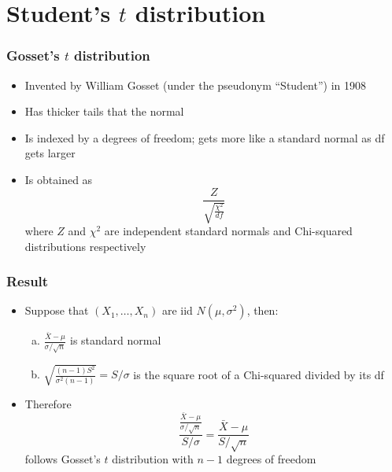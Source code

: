 \documentclass[aspectratio=169]{beamer}
\begin{document}
\section{Student's $t$ distribution}
\begin{frame}\frametitle{Gosset's $t$ distribution}
\begin{itemize}
\item Invented by William Gosset (under the pseudonym ``Student'') in 1908
\item Has thicker tails that the normal
\item Is indexed by a degrees of freedom; gets more like a standard
  normal as df gets larger
\item Is obtained as 
$$
\frac{Z}{\sqrt{\frac{\chi^2}{df}}}
$$
where $Z$ and $\chi^2$ are independent standard normals and
Chi-squared distributions respectively
\end{itemize}
\end{frame}

\begin{frame}\frametitle{Result}
\begin{itemize}
\item Suppose that $(X_1,\ldots,X_n)$ are iid $N(\mu,\sigma^2)$,
  then:
  \begin{enumerate}[a.]
  \item $\frac{\bar X - \mu}{\sigma / \sqrt{n}}$ is standard normal
  \item $\sqrt{\frac{(n - 1) S^2}{\sigma^2 (n - 1)}} = S / \sigma$
    is the square root of a Chi-squared divided by its df
  \end{enumerate}
  \item Therefore 
    $$
\frac{\frac{\bar X - \mu}{\sigma /\sqrt{n}}}{S/\sigma}  
= \frac{\bar X - \mu}{S/\sqrt{n}}
    $$
    follows Gosset's $t$ distribution with $n-1$ degrees of freedom
\end{itemize}
\end{frame}
\end{document}
